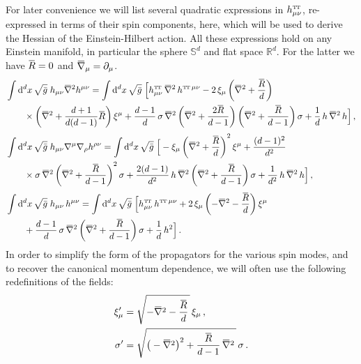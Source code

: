 \documentclass[11pt]{book}
\newcommand{\overbar}[1]{\mkern 1.5mu\overline{\mkern-1.5mu#1\mkern-1.5mu}\mkern 1.5mu}
\newcommand\TTspace{ -1pt }
\newcommand\TT{ \scriptscriptstyle{\mathrm{T\hspace{\TTspace}T}} }
\newcommand\hTTmunu{ h^{\scriptscriptstyle{\mathrm{T\hspace{\TTspace}T}}}_{\mu\nu} }
\newcommand{\bnabla}{\overbar \nabla}
\newcommand{\bR}{\overbar R}
\numberwithin{equation}{chapter}
\begin{document}
\begin{appendices}
For later convenience we will list several quadratic expressions in $\hTTmunu$,
re-expressed in terms of their spin components, here,
which will be used to derive the Hessian of the Einstein-Hilbert action.
All these expressions hold on any Einstein manifold, in particular the sphere $\mathbb S^d$
and flat space $\mathbb R^d$. For the latter we have $\bR = 0$ and $\bnabla_\mu = \partial_\mu$.
\begin{align}
  \label{hterms1}
  & \int \mathrm d^dx \, \sqrt{\bar g} \; h_{\mu\nu} \bnabla^2 h^{\mu\nu}
  = \int \mathrm d^dx \, \sqrt{\bar g} \;
  \Big[
    \hTTmunu \, \bnabla^2 \, h^{{\TT}\,\mu\nu}
    - 2 \, \xi_\mu \left( \bnabla^2 + \frac{\bR}{d} \right) \nonumber \\
    & \qquad \times \left( \bnabla^2 + \frac{d+1}{d(d-1)} \bR \right) \xi^\mu
    + \frac{d-1}{d} \, \sigma \, \bnabla^2
    \left( \bnabla^2 + \frac{2\bR}{d-1} \right)
    \left( \bnabla^2 + \frac{\bR}{d-1} \right) \sigma
    + \frac{1}{d} \, h \, \bnabla^2 \, h
  \Big] \,, \\[1mm]
  \label{hterms2}
  & \int \mathrm d^dx \, \sqrt{\bar g} \; h_{\mu\nu} \nabla^\mu \nabla_\rho h^{\rho\nu} =
  \int \mathrm d^dx \, \sqrt{\bar g} \;
  \Big[
    - \xi_\mu \left( \bnabla^2 + \frac{\bR}{d} \right)^2 \xi^\mu
    + \frac{(d-1)^2}{d^2} \nonumber \\
    & \qquad \times \sigma \, \bnabla^2 \left( \bnabla^2 + \frac{\bR}{d-1} \right)^2 \sigma
    + \frac{2(d-1)}{d^2} \, h \, \bnabla^2 \left( \bnabla^2 + \frac{\bR}{d-1} \right) \sigma
    + \frac{1}{d^2} \, h \, \bnabla^2 \, h
  \Big] \,, \\[1mm]
  \label{hterms3}
  & \int \mathrm d^dx \, \sqrt{\bar g} \; h_{\mu\nu} \, h^{\mu\nu} =
  \int \mathrm d^dx \, \sqrt{\bar g} \;
  \Big[\hTTmunu \, h^{{\TT}\,\mu\nu}
    + 2 \, \xi_\mu \left( -\bnabla^2 - \frac{\bR}{d} \right) \xi^\mu \nonumber \\
    & \qquad + \frac{d-1}{d} \, \sigma \, \bnabla^2 \left( \bnabla^2 + \frac{\bR}{d-1} \right) \sigma
    + \frac{1}{d} \, h^2
  \Big] \,.
\end{align}
In order to simplify the form of the propagators for the various spin modes,
and to recover the canonical momentum dependence, we will often use
the following redefinitions of the fields:
\begin{align}
  \xi'_\mu &= \sqrt{-\bnabla^2-\frac{\bR}{d} \, } \, \xi_\mu \,, \\
  \sigma'  &=
  \sqrt{
    \big( -\bnabla^2 \big) ^2 + \frac{\bR}{d-1} \, \bnabla^2 \,
  } \, \sigma \,.
  \label{fieldredefs}
\end{align}



\end{appendices}
\end{document}
